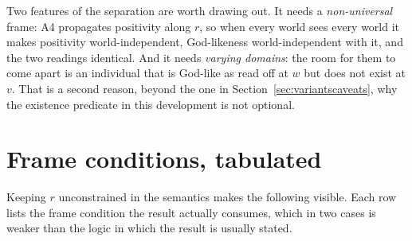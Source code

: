 \documentclass[11pt]{article}
\theoremstyle{plain}
\theoremstyle{definition}
\begin{document}
Two features of the separation are worth drawing out. It needs a
\emph{non-universal} frame: A4 propagates positivity along $r$, so when every
world sees every world it makes positivity world-independent, God-likeness
world-independent with it, and the two readings identical. And it needs
\emph{varying domains}: the room for them to come apart is an individual that
is God-like as read off at $w$ but does not exist at $v$. That is a second
reason, beyond the one in Section~\ref{sec:variantscaveats}, why the existence
predicate in this development is not optional.

\section{Frame conditions, tabulated}\label{sec:frames}

Keeping $r$ unconstrained in the semantics makes the following visible. Each
row lists the frame condition the result actually consumes, which in two cases
is weaker than the logic in which the result is usually stated.
\end{document}
